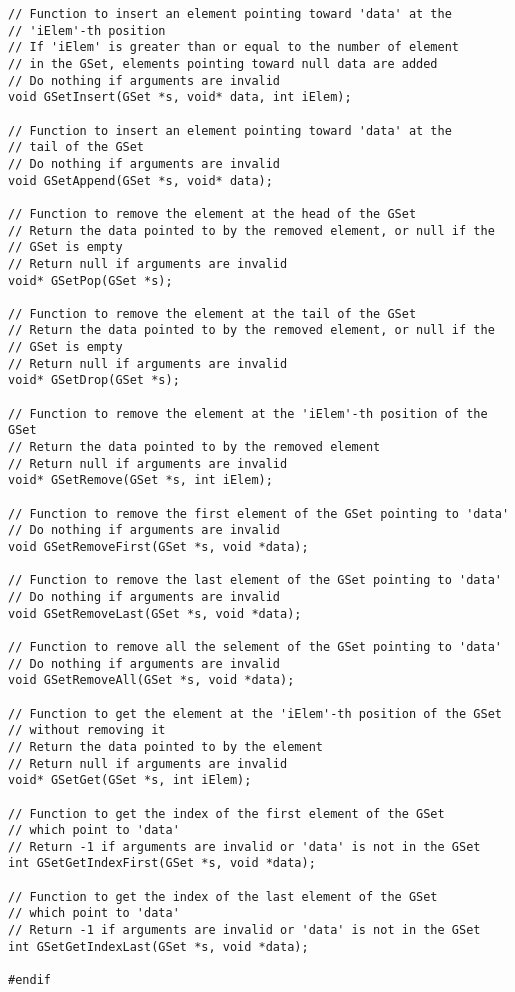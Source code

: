 \documentclass[12pt, a4paper]{article}
\begin{document}
\begin{scriptsize}
\begin{ttfamily}
\begin{lstlisting}
// Function to insert an element pointing toward 'data' at the 
// 'iElem'-th position 
// If 'iElem' is greater than or equal to the number of element
// in the GSet, elements pointing toward null data are added
// Do nothing if arguments are invalid
void GSetInsert(GSet *s, void* data, int iElem);

// Function to insert an element pointing toward 'data' at the 
// tail of the GSet
// Do nothing if arguments are invalid
void GSetAppend(GSet *s, void* data);

// Function to remove the element at the head of the GSet
// Return the data pointed to by the removed element, or null if the 
// GSet is empty
// Return null if arguments are invalid
void* GSetPop(GSet *s);

// Function to remove the element at the tail of the GSet
// Return the data pointed to by the removed element, or null if the 
// GSet is empty
// Return null if arguments are invalid
void* GSetDrop(GSet *s);

// Function to remove the element at the 'iElem'-th position of the GSet
// Return the data pointed to by the removed element
// Return null if arguments are invalid
void* GSetRemove(GSet *s, int iElem);

// Function to remove the first element of the GSet pointing to 'data'
// Do nothing if arguments are invalid
void GSetRemoveFirst(GSet *s, void *data);

// Function to remove the last element of the GSet pointing to 'data'
// Do nothing if arguments are invalid
void GSetRemoveLast(GSet *s, void *data);

// Function to remove all the selement of the GSet pointing to 'data'
// Do nothing if arguments are invalid
void GSetRemoveAll(GSet *s, void *data);

// Function to get the element at the 'iElem'-th position of the GSet
// without removing it
// Return the data pointed to by the element
// Return null if arguments are invalid
void* GSetGet(GSet *s, int iElem);

// Function to get the index of the first element of the GSet
// which point to 'data'
// Return -1 if arguments are invalid or 'data' is not in the GSet
int GSetGetIndexFirst(GSet *s, void *data);

// Function to get the index of the last element of the GSet
// which point to 'data'
// Return -1 if arguments are invalid or 'data' is not in the GSet
int GSetGetIndexLast(GSet *s, void *data);

#endif
\end{lstlisting}
\end{ttfamily}
\end{scriptsize}
\end{document}
